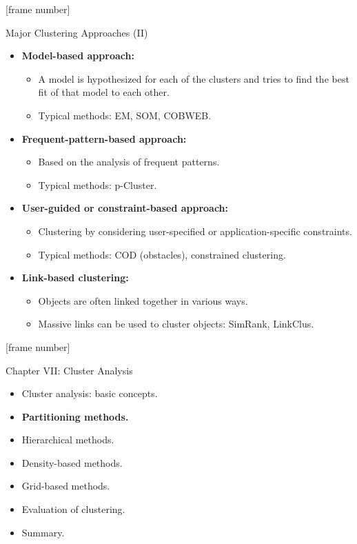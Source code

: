 \documentclass[aspectratio=169,t,xcolor=dvipsnames]{beamer}
\begin{document}
  {
    [frame number]
    \begin{frame}{Major Clustering Approaches (II)}
        \begin{itemize}
          \item \textbf{Model-based approach:}
          \begin{itemize}
            \item A model is hypothesized for each of the clusters and tries to find the best fit of that model to each other.
            \item Typical methods: EM, SOM, COBWEB.
          \end{itemize}
          \item \textbf{Frequent-pattern-based approach:}
          \begin{itemize}
            \item Based on the analysis of frequent patterns.
            \item Typical methods: p-Cluster.
          \end{itemize}
          \item \textbf{User-guided or constraint-based approach:}
          \begin{itemize}
            \item Clustering by considering user-specified or application-specific constraints.
            \item Typical methods: COD (obstacles), constrained clustering.
          \end{itemize}
          \item \textbf{Link-based clustering:}
          \begin{itemize}
            \item Objects are often linked together in various ways.
            \item Massive links can be used to cluster objects: SimRank, LinkClus.
          \end{itemize}
        \end{itemize}
    \end{frame}
  }

  {
    [frame number]
    \begin{frame}{Chapter VII: Cluster Analysis}
        \begin{itemize}
            \item Cluster analysis: basic concepts.
            \item \textbf{Partitioning methods.}
            \item Hierarchical methods.
            \item Density-based methods.
            \item Grid-based methods.
            \item Evaluation of clustering.
            \item Summary.
        \end{itemize}
    \end{frame}
  }
\end{document}
